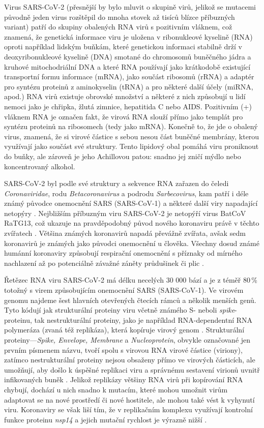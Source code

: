 Virus SARS-CoV-2 (přesnější by bylo mluvit o skupině virů, jelikož se mutacemi původně jeden virus rozštěpil do mnoha stovek až tisíců blízce příbuzných variant) patří do skupiny obalených RNA virů s pozitivním vláknem, což znamená, že genetická informace viru je uložena v ribonukleové kyselině (RNA) oproti například lidským buňkám, které genetickou informaci stabilně drží v deoxyribonukleové kyselině (DNA) smotané do chromosomů buněčného jádra a kruhové mitochodriální DNA a které RNA používají jako krátkodobě existující transportní formu informace (mRNA), jako součást ribosomů (rRNA) a adaptér pro syntézu proteinů z aminokyselin (tRNA) a pro některé další účely (miRNA, apod.) RNA virů existuje obrovské množství a některé z nich způsobují u lidí nemoci jako je chřipka, žlutá zimnice, hepatitida C nebo AIDS. Pozitivním (+) vláknem RNA je označen fakt, že virová RNA slouží přímo jako templát pro syntézu proteinů na ribosomech (tedy jako mRNA). Konečně to, že jde o obalený virus, znamená, že si virové částice s sebou nesou část buněčné membrány, kterou využívají jako součást své struktury. Tento lipidový obal pomáhá viru proniknout do buňky, ale zároveň je jeho Achillovou patou: snadno jej zničí mýdlo nebo koncentrovaný alkohol.

SARS-CoV-2 byl podle své struktury a sekvence RNA zařazen do čeledi \textit{Coronaviridae}, rodu \textit{Betacoronavirus} a podrodu \textit{Sarbecovirus}, kam patří i déle známý původce onemocnění SARS (SARS-CoV-1) a některé další viry napadající netopýry \cite{Zhou:2020,Lu:2020a}. Nejbližším příbuzným viru SARS-CoV-2 je netopýří virus BatCoV RaTG13, což ukazuje na pravděpodobný původ nového koronaviru právě v těchto zvířatech \cite{Chan:2020,Hu:2021}. Většina známých koronavirů napadá převážně zvířata, avšak sedm koronavirů je známých jako původci onemocnění u člověka. Všechny dosud známé humánní koronaviry způsobují respirační onemocnění s příznaky od mírného nachlazení až po potenciálně závažné záněty průdušinek či plic \cite{Wevers:2009}.

Řetězec RNA viru SARS-CoV-2 má délku necelých 30 000 bází a je z téměř 80\,\% totožný s virem způsobujícím onemocnění SARS (SARS-CoV-1). Ve virovém genomu najdeme šest hlavních otevřených čtecích rámců a několik menších genů. Tyto kódují jak strukturální proteiny viru včetně známého S- neboli \textit{spike}-proteinu, tak nestrukturální proteiny, jako je například RNA-dependentní RNA polymeráza (zvaná též replikáza), která kopíruje virový genom \cite{Chan:2020}. Strukturální proteiny---\textit{Spike, Envelope, Membrane} a \textit{Nucleoprotein}, obvykle označované jen prvním písmenem názvu, tvoří spolu s virovou RNA virové částice (viriony), zatímco nestrukturální proteiny nejsou obsaženy přímo ve virových částicích, ale umožňují, aby došlo k úspěšné replikaci viru a správnému sestavení virionů uvnitř infikovaných buněk \cite{Mittal:2020}. Jelikož replikázy většiny RNA virů při kopírování RNA chybují, dochází u nich snadno k mutacím, které mohou umožnit virům adaptovat se na nové prostředí či nové hostitele, ale mohou také vést k vyhynutí viru. Koronaviry se však liší tím, že v replikačním komplexu využívají kontrolní funkce proteinu \textit{nsp14} a jejich mutační rychlost je výrazně nižší \cite{Robson:2020}.

